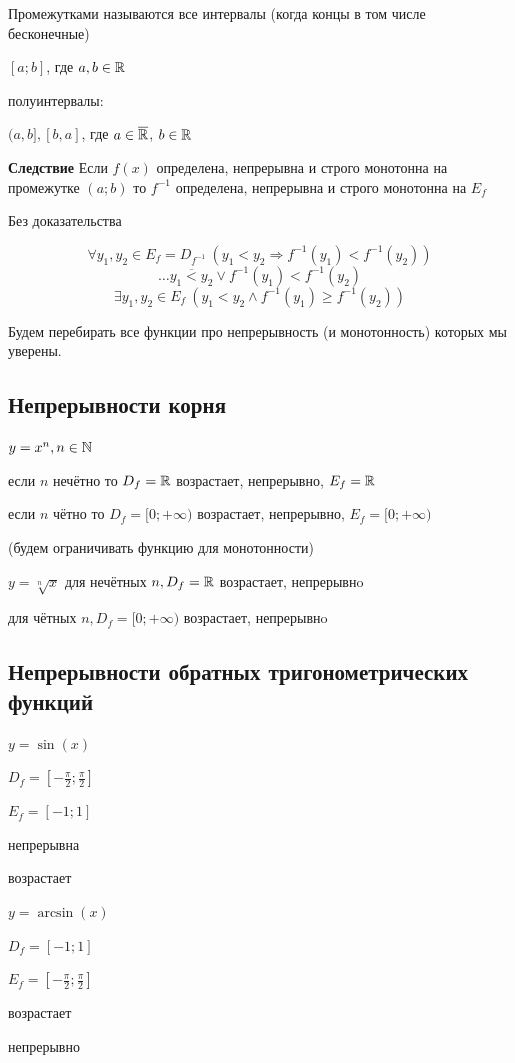 \begin{example}[Следствие]
	Промежутками называются все интервалы (когда концы в том числе бесконечные)

	$[a;b]$, где $a,b \in \mathbb{R}$

	полуинтервалы:

	$(a,b], [b, a]$, где $a \in \overline{\mathbb{R}}$, $b \in \mathbb{R}$


	\textbf{Следствие} Если $f(x)$ определена, непрерывна и строго монотонна на промежутке $(a; b)$ то $f^{-1}$ определена, непрерывна и строго монотонна на $E_f$

	Без доказательства
\end{example}



\begin{example}[Упражнение]
		\[
			\forall y_1, y_2 \in E_f = D_{f^{-1} }\ (y_1 < y_2 \Rightarrow f^{-1}(y_1) < f^{-1} (y_2)  )
		\]
		\[
			\ldots \overline{y_1 < y_2} \lor f^{-1}(y_1) < f^{-1}(y_2)  
		\]
		\[
			\exists y_1,y_2 \in E_f\ (y_1 < y_2 \land f^{-1}(y_1) \geq f^{-1}(y_2)  )
		\]

\end{example}

Будем перебирать все функции про непрерывность (и монотонность) которых мы уверены.

\subsection{Непрерывности корня}
\begin{theorem}
	$y = x^n, n \in \mathbb{N}$

	если $n$ нечётно то $D_f = \mathbb{R}$ возрастает, непрерывно, $E_f = \mathbb{R}$

	если $n$ чётно то $D_f = [0; +\infty)$ возрастает, непрерывно, $E_f = [0; +\infty)$

	(будем ограничивать функцию для монотонности)

	$y = \sqrt[n]x$ для нечётных $n, D_f = \mathbb{R}$ возрастает, непрерывнo

	для чётных $n, D_f = [0; +\infty) $ возрастает, непрерывнo

\end{theorem}


\subsection{Непрерывности обратных тригонометрических функций}
\begin{theorem}
	$y = \sin(x)$

	$D_f = [-\frac{\pi}{2}; \frac{\pi}{2}]$

	$E_f = [-1; 1]$

	непрерывна

	возрастает

	$y = \arcsin(x)$

	$D_f = [-1; 1]$

	$E_f = [-\frac{\pi}{2}; \frac{\pi}{2}]$

	возрастает

	непрерывно

\end{theorem}

